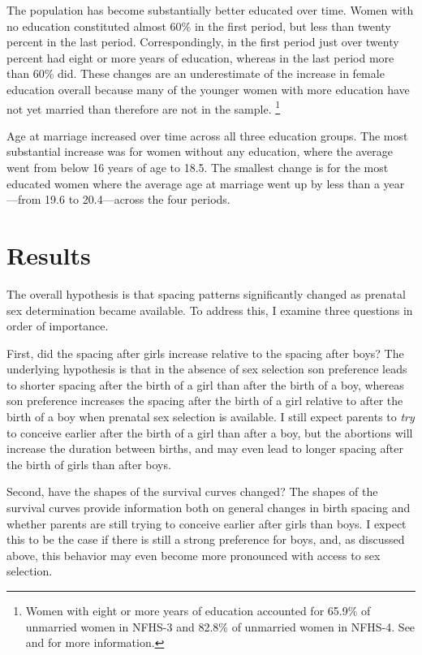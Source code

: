 \documentclass[12pt,letterpaper]{article}
\begin{document}
The population has become substantially better educated over time.
Women with no education constituted almost 60\% 
in the first period, but less than twenty percent in the last period.
Correspondingly, in the first period just over twenty percent had eight or more 
years of education, whereas in the last period more than 60\% did.
These changes are an underestimate of the increase in female
education overall because many of the younger women with more education
have not yet married than therefore are not in the sample.%
\footnote{
Women with eight or more years of education accounted for 65.9\% of
unmarried women in NFHS-3 and 82.8\% of unmarried women in NFHS-4.
See \citet[p 56]{International-Institute-for-Population-Sciences-IIPS2007}
and \citet[p 61]{International-Institute-for-Population-Sciences-IIPS2017}
for more information.
 }

Age at marriage increased over time across all three education groups.
The most substantial increase was for women without any education, where
the average went from below 16 years of age to 18.5.
The smallest change is for the most educated women where the average age
at marriage went up by less than a year---from 19.6 to 20.4---across the 
four periods.


\section{Results\label{sec:results}}


The overall hypothesis is that spacing patterns significantly changed 
as prenatal sex determination became available.
To address this, I examine three questions in order of importance.

First, did the spacing after girls increase relative to the spacing
after boys?
The underlying hypothesis is that in the absence of sex selection son 
preference leads to shorter spacing after the birth of a girl than after the 
birth of a boy, whereas son preference increases the spacing after the birth 
of a girl relative to after the birth of a boy when prenatal sex selection is 
available.
I still expect parents to \emph{try} to conceive earlier after the birth 
of a girl than after a boy, but the abortions will increase the 
duration between births, and may even lead to longer spacing after the
birth of girls than after boys.


Second, have the shapes of the survival curves changed?
The shapes of the survival curves provide information both on general
changes in birth spacing and whether parents are
still trying to conceive earlier after girls than boys.
I expect this to be the case if there is still a strong preference for
boys, and, as discussed above, this behavior may even become more pronounced
with access to sex selection.
\end{document}
